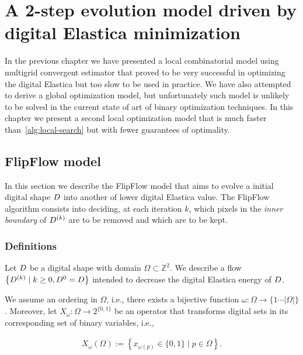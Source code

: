 \chapter{A 2-step evolution model driven by digital Elastica minimization}
\label{chapter:flip-flow}

In the previous chapter we have presented a local combinatorial model using multigrid convergent estimator that proved to be very successful in optimizing the digital Elastica but too slow to be used in practice. We have also attempted to derive a global optimization model, but unfortunately such model is unlikely to be solved in the current state of art of binary optimization techniques. In this chapter we present a second local optimization model that is much faster than~\cref{alg:local-search} but with fewer guarantees of optimality.

\section{FlipFlow model}
\label{ch7:sec:flipflow-model}

In this section we describe the FlipFlow model that aims to evolve a initial digital shape $D$ into another of lower digital Elastica value. The FlipFlow algorithm consists into deciding, at each iteration $k$, which pixels in the \emph{inner boundary} of $D^{(k)}$ are to be removed  and which are to be kept. 

\subsection{Definitions}
\label{ch7:subsec:definitions}

Let $D$ be a digital shape with domain $\Omega \subset \mathbb{Z}^2$. We describe a flow $\left \{ D^{(k)} \; | \; k \geq 0, D^{0} = D \right\}$ intended to decrease the digital Elastica energy of $D$.

We assume an ordering in $\Omega$, i.e., there exists a bijective function $\omega : \Omega \rightarrow \{1 \cdots |\Omega| \}$. Moreover, let $X_{\omega}:\Omega \rightarrow 2^{\{0,1\}}$ be an operator that transforms digital sets in its corresponding set of binary variables, i.e.,

\begin{align*}
	X_{\omega}(\Omega) := \left\{ x_{\omega(p)} \in \{0,1\} \; | \; p \in \Omega \right\}.
\end{align*}

